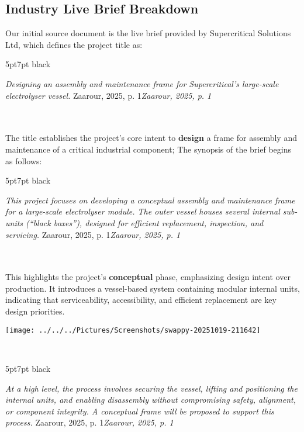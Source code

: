 \documentclass[9pt]{extarticle}
\newcommand{\formalsource}{}
\newenvironment{formal}[3][]{	\renewcommand{\formalsource}{#1}
	\def\lefty{\color{#2}\textquotedblleft}
	\def\righty{\color{#2}\textquotedblright}
	\def\FrameCommand{%
		\hspace{1pt}%
		{\color{#2}\vrule width 2pt}%
		{\color{#3}\vrule width 4pt}%
		\colorbox{#3}%
	}%
	\MakeFramed{\advance\hsize-\width\FrameRestore}%
	\begin{adjustwidth}{5pt}{7pt}%
		\ifx#2\empty\else\smash{\raisebox{-0.5em}{\Huge\lefty}}\hspace{0em}\fi%
	}{%
		\hspace{0em}\smash{\raisebox{-0.5em}{\Huge\righty}}\hfill%
		\ifx\formalsource\empty\else\hfill{\footnotesize\textit{\formalsource}}\fi%
	\end{adjustwidth}%
	\endMakeFramed%
	\noindent%
	\\
}
\begin{document}
\subsection{Industry Live Brief Breakdown}
\begin{minipage}{0.58\textwidth}
Our initial source document is the live brief provided by {Supercritical Solutions Ltd}, which defines the project title as:\\[-0.6em]
\begin{formal}[Zaarour, 2025, p. 1]{black}{white}
\textit{	Designing an assembly and maintenance frame for Supercritical’s large-scale electrolyser vessel.}
\end{formal}\\[-1.8em]
The title establishes the project’s core intent to \textbf{design} a frame for assembly and maintenance of a critical industrial component; The synopsis of the brief begins as follows:\\[-0.6em]
\begin{formal}[Zaarour, 2025, p. 1]{black}{white}
\textit{	This project focuses on developing a conceptual assembly and maintenance frame for a large-scale electrolyser module. The outer vessel houses several internal sub-units (“black boxes”), designed for efficient replacement, inspection, and servicing.}
\end{formal}\\[-1.8em]
This highlights the project’s \textbf{conceptual} phase, emphasizing design intent over production. It introduces a vessel-based system containing modular internal units, indicating that serviceability, accessibility, and efficient replacement are key design priorities.\\[1em]
\end{minipage}\hfill
\begin{minipage}{0.4\textwidth}
    \texttt{[image: ../../../Pictures/Screenshots/swappy-20251019-211642]}
\end{minipage}\\\vspace{-0.6em}
\begin{formal}[Zaarour, 2025, p. 1]{black}{white}
\textit{	At a high level, the process involves securing the vessel, lifting and positioning the internal units, and enabling disassembly without compromising safety, alignment, or component integrity. A conceptual frame will be proposed to support this process.}
\end{formal}
\end{document}
